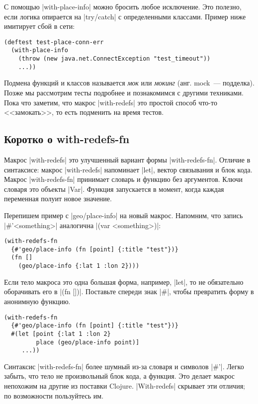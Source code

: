С помощью \spverb|with-place-info| можно бросить любое исключение. Это полезно,
если логика опирается на \spverb|try/catch| с определенными классами. Пример
ниже имитирует сбой в сети:

\begin{verbatim}
(deftest test-place-conn-err
  (with-place-info
    (throw (new java.net.ConnectException "test_timeout"))
    ...))
\end{verbatim}

Подмена функций и классов называется \emph{мок} или \emph{мокинг} (анг. mock~---
подделка). Позже мы рассмотрим тесты подробнее и познакомимся с другими
техниками. Пока что заметим, что макрос \spverb|with-redefs| это простой способ
что-то <<замокать>>, то есть подменить на время тестов.

\subsection{Коротко о with-redefs-fn}

Макрос \spverb|with-redefs| это улучшенный вариант формы
\spverb|with-redefs-fn|. Отличие в синтаксисе: макрос \spverb|with-redefs|
напоминает \spverb|let|, вектор связывания и блок кода. Макрос
\spverb|with-redefs-fn| принимает словарь и функцию без аргументов. Ключи
словаря это объекты \spverb|Var|. Функция запускается в момент, когда каждая
переменная полуит новое значение.

Перепишем пример с \spverb|geo/place-info| на новый макрос. Напомним, что запись
\spverb|#'<something>| аналогична \spverb|(var <something>)|:

\begin{verbatim}
(with-redefs-fn
  {#'geo/place-info (fn [point] {:title "test"})}
  (fn []
    (geo/place-info {:lat 1 :lon 2})))
\end{verbatim}

Если тело макроса это одна большая форма, например, \spverb|let|, то не
обязательно оборачивать его в \spverb|(fn [])|. Поставьте спереди знак
\spverb|#|, чтобы превратить форму в анонимную функцию.

\begin{verbatim}
(with-redefs-fn
  {#'geo/place-info (fn [point] {:title "test"})}
  #(let [point {:lat 1 :lon 2}
         place (geo/place-info point)]
     ...))
\end{verbatim}

Синтаксис \spverb|with-redefs-fn| более шумный из-за словаря и символов
\spverb|#'|. Легко забыть, что тело не произвольный блок кода, а функция. Это
делает макрос непохожим на другие из поставки Clojure. \spverb|With-redefs|
скрывает эти отличия; по возможности пользуйтесь им.

